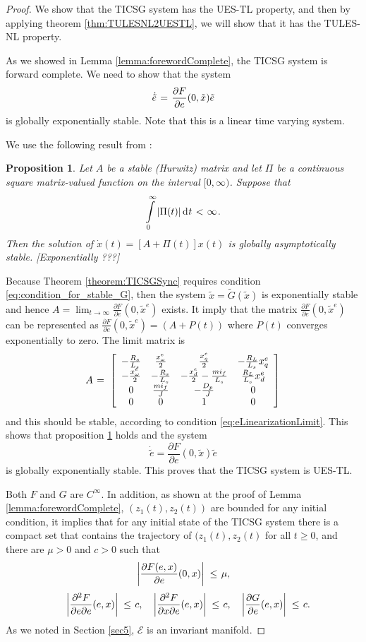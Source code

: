 \documentclass[letterpaper,10pt,conference]{ieeeconf}
\newtheorem{proposition}[theorem]{Proposition}
\renewcommand{\o}    {{\omega}}
\newcommand{\m}      {{\hbox{\hskip 1pt}}}
\newcommand{\dd}     {{\rm d\hbox{\hskip 0.5pt}}}
\newcommand{\Emscr}  {{\mathcal{E}}}
\begin{document}
\begin{proof}
We show that the TICSG system has the UES-TL property, and then by
applying theorem \ref{thm:TULESNL2UESTL}, we will show that it has
the TULES-NL property.

As we showed in Lemma \ref{lemma:forewordComplete}, the TICSG system
is forward complete. We need to show that the system
$$ \dot{\tilde{e}} \m=\m \frac{\partial F}{\partial e}(0,\tilde{x})
   \tilde{e}$$
is globally exponentially stable. Note that this is a linear time
varying system.

We use the following result from \cite[Theorem 4.2.7]
{SchovanecGilliam1999}:

\begin{proposition}\label{proposition:LTVStability}
Let $A$ be a stable (Hurwitz) matrix and let $\Pi$ be a
continuous square matrix-valued function on the interval
$[0,\infty)$. Suppose that
$$\intop_0^\infty \left|\Pi(t)\right| \dd t \m<\m \infty \m.$$
Then the solution of $\dot{x}(t)=[A+\Pi(t)]x(t)$ is globally 
asymptotically stable. [Exponentially ???]
\end{proposition}
 
Because Theorem \ref{theorem:TICSGSync} requires condition
\eqref{eq:condition_for_stable_G}, then the system $\tilde{x}=
\tilde{G}(\tilde{x})$ is exponentially stable and hence $A =
\lim_{t \to \infty}\frac{\partial F}{\partial e}(0,\tilde{x}^e)$
exists.  It imply that the matrix $\frac{\partial F}{\partial
e}(0,\tilde{x}^e)$ can be represented as $\frac{\partial F}{\partial
e}(0,\tilde{x}^e) = \left(A+P(t)\right)$ where $P(t)$ converges
exponentially to zero. The limit matrix is
$$ A \m=\m \left[\begin{array}{cccc} -\frac{R_{s}}{L_s} & 
   \frac{x^e_\o}{2} & \frac{x^e_q}{2} & -\frac{R_L}{L_s} x^e_q\\
   -\frac{x^e_\o}{2} & -\frac{R_s}{L_s} & -\frac{x^e_d}{2}-\frac
   {mi_f}{L_s} & \frac{R_L}{L_s} x^e_d\\ 0 & \frac{mi_f}{J} & 
   -\frac{D_p}{J} & 0\\ 0 & 0 & 1 & 0 \end{array}\right]$$
and this should be stable, according to condition
\eqref{eq:eLinearizationLimit}. This shows that proposition
\ref{proposition:LTVStability} holds and the system
$$ \dot{\tilde{e}}=\frac{\partial F}{\partial e}(0,\tilde{x})
   \tilde{e}$$
is globally exponentially stable. This proves that the TICSG system
is UES-TL. 

Both $F$ and $G$ are $C^\infty$. In addition, as shown at the proof of
Lemma \ref{lemma:forewordComplete}, $\left(z_1(t),z_2(t)\right)$ are
bounded for any initial condition, it implies that for any initial
state of the TICSG system there is a compact set that contains the
trajectory of $(z_1(t),z_2(t)$ for all $t\geq 0$, and there are
$\mu>0$ and $c>0$ such that
$$\left|\frac{\partial F(e,x)}{\partial e}(0,x)\right| \m\leq\m \mu,$$
$$ \quad \left| \frac{\partial^2 F}{\partial e \partial e}(e,x)\right|
   \m\leq\m c, \quad \left| \frac{\partial^2 F}{\partial x \partial e}
   (e,x)\right| \m\leq\m c,\quad\left| \frac{\partial G}{\partial e}
   (e,x) \right| \m\leq\m c.$$
As we noted in Section \ref{sec5}, $\Emscr$ is an invariant manifold.


\end{proof}
\end{document}
